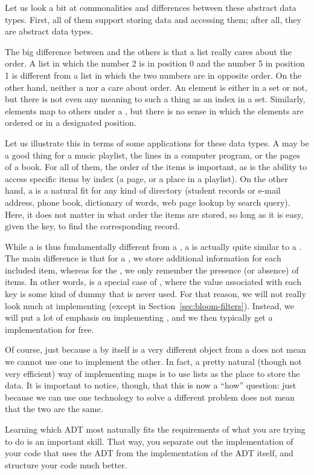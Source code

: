 Let us look a bit at commonalities and differences between these
abstract data types. 
First, all of them support storing data and accessing them;
after all, they are abstract data types.

The big difference between  and the others is that a list
really cares about the order. 
A list in which the number 2 is in position 0 and the number 5 in
position 1 is different from a list in which the two numbers are in
opposite order.
On the other hand, neither a  nor a  care about
order. An element is either in a set or not, but there is not even any
meaning to such a thing as an index in a set. 
Similarly, elements map to others under a , but there is no
sense in which the elements are ordered or in a designated position.

Let us illustrate this in terms of some applications for these data
types. A  may be a good thing for a music playlist,
the lines in a computer program, or the pages of a book.
For all of them, the order of the items is important, as is the
ability to access specific items by index (a page, or a place in a
playlist).
On the other hand, a  is a natural fit for any kind of
directory (student records or e-mail address, phone book, dictionary
of words, web page lookup by search query).
Here, it does not matter in what order the items are stored,
so long as it is easy, given the key,
to find the corresponding record.

While a  is thus fundamentally different from a ,
a  is actually quite similar to a . The main
difference is that for a , we store additional information
for each included item, whereas for the ,
we only remember the presence (or absence) of items. 
In other words,  is a special case of , where the
value associated with each key is some kind of dummy that is never
used. For that reason, we will not really look much at implementing
 (except in Section~\ref{sec:bloom-filters}). 
Instead, we will put a lot of emphasis on implementing ,
and we then typically get a  implementation for free.

Of course, just because a  by itself is a very different
object from a  does not mean we cannot use one to implement
the other. In fact, a pretty natural (though not very efficient) way
of implementing maps is to use lists as the place to store the data.
It is important to notice, though, that this is now a ``how'' question:
just because we can use one technology to solve a different problem
does not mean that the two are the same.

Learning which ADT most naturally fits the requirements of what you
are trying to do is an important skill.
That way, you separate out the implementation of your code that uses
the ADT from the implementation of the ADT itself,
and structure your code much better. 